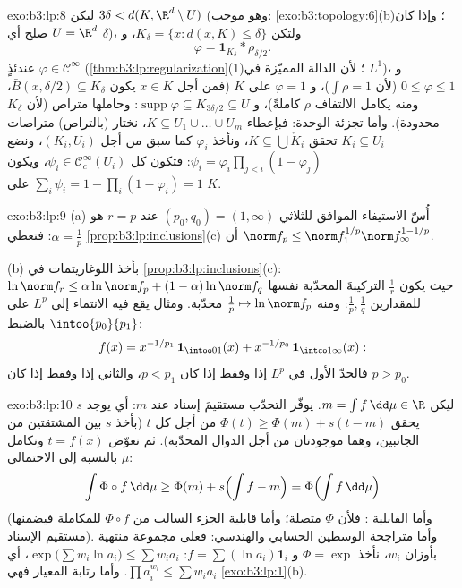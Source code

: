 \begin{solution}{exo:b3:lp:8}
ليكن $3\delta < d(K, \R^d\setminus U)$ (وهو موجب: \cref{exo:b3:topology:6}(b)؛ وإذا كان $U = \R^d$
صلح أي $\delta$)، ولتكن $K_\delta = \{x : d(x, K) \leq \delta\}$، و
\[
\varphi = \mathbf 1_{K_\delta} * \rho_{\delta/2} .
\]
عندئذٍ $\varphi \in \mathcal C^\infty$ (\cref{thm:b3:lp:regularization}(1)؛ لأن الدالة المميّزة في $L^1$)،
و $0 \leq \varphi \leq 1$ (لأن $\int\rho = 1$)، و $\varphi = 1$ على $K$ (فمن أجل
$x \in K$ يكون $\bar B(x, \delta/2) \subseteq K_\delta$، ومنه يكامل الالتفاف $\rho$ كاملةً)،
و $\operatorname{supp}\varphi \subseteq K_{3\delta/2} \subseteq
U$: وحاملها متراص (لأن $K_\delta$ محدودة). وأما تجزئة
الوحدة: فبإعطاء $K \subseteq U_1\cup\dots\cup U_m$، نختار (بالتراص) متراصات $K_i \subseteq U_i$ تحقق
$K \subseteq
\bigcup \mathring K_i$، ونأخذ $\varphi_i$ كما سبق من أجل $(K_i,
U_i)$، ونضع $\psi_i = \varphi_i\prod_{j <i}(1 -
\varphi_j)$:
فتكون كل $\psi_i \in \mathcal C_c^\infty(U_i)$، ويكون $\sum_i\psi_i = 1 - \prod_i(1 - \varphi_i) = 1$ على $K$.
\end{solution}

\begin{solution}{exo:b3:lp:9}
(a) أُسّ الاستيفاء الموافق للثلاثي $(p_0, q_0) = (1, \infty)$ عند $r = p$ هو
$\alpha = \frac1p$: فتعطي \cref{prop:b3:lp:inclusions}(c) أن $\norm f_p \leq \norm
f_1^{1/p}\norm f_\infty^{1 - 1/p}$.

(b) بأخذ اللوغاريتمات في \cref{prop:b3:lp:inclusions}(c): $\ln\norm f_r \leq
\alpha\ln\norm f_p + (1-\alpha)\ln\norm f_q$ حيث يكون
$\frac1r$ التركيبةَ المحدّبة نفسها للمقدارين $\frac1p, \frac1q$: ومنه
$\frac1p
\mapsto \ln\norm f_p$ محدّبة. ومثال يقع فيه الانتماء إلى $L^p$ على $\intoo{p_0}{p_1}$
بالضبط:
\[
f(x) = x^{-1/p_1}\,\mathbf 1_{\intoo01}(x) +
x^{-1/p_0}\,\mathbf 1_{\intco1\infty}(x):
\]
فالحدّ الأول في $L^p$ إذا وفقط إذا كان $p < p_1$، والثاني إذا
وفقط إذا كان $p >
p_0$.
\end{solution}

\begin{solution}{exo:b3:lp:10}
ليكن $m = \int f\,\dd\mu \in \R$. يوفّر التحدّب مستقيمَ إسناد عند $m$: أي يوجد $s$
يحقق $\Phi(t) \geq \Phi(m) + s(t -
m)$ من أجل كل $t$ (بأخذ $s$ بين المشتقتين من الجانبين،
وهما موجودتان من أجل الدوال المحدّبة). ثم نعوّض $t = f(x)$
ونكامل بالنسبة إلى  الاحتمالي $\mu$:
\[
\int\Phi\circ f\,\dd\mu \geq \Phi(m) + s\Bigl(\int f - m\Bigr)
= \Phi\Bigl(\int f\,\dd\mu\Bigr)
\]
(وأما القابلية : فلأن $\Phi$ متصلة؛ وأما قابلية الجزء
السالب من $\Phi\circ f$ للمكاملة فيضمنها مستقيم الإسناد). وأما
متراجحة الوسطين الحسابي والهندسي: فعلى مجموعة منتهية بأوزان
$w_i$، نأخذ $\Phi = \exp$ و $f = \sum(\ln a_i)\mathbf 1_i$: $\exp\bigl(\sum w_i\ln a_i\bigr) \leq \sum w_ia_i$، أي $\prod a_i^{w_i} \leq \sum w_ia_i$. وأما
رتابة المعيار فهي \cref{exo:b3:lp:1}(b).
\end{solution}

